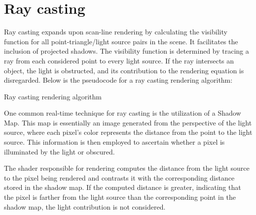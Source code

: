 \section{Ray casting}
Ray casting expands upon scan-line rendering by calculating the visibility function for all point-triangle/light source pairs in the scene. 
It facilitates the inclusion of projected shadows. 
The visibility function is determined by tracing a ray from each considered point to every light source. 
If the ray intersects an object, the light is obstructed, and its contribution to the rendering equation is disregarded. 
Below is the pseudocode for a ray casting rendering algorithm:
\begin{algorithm}[H]
    \caption{Ray casting rendering algorithm}
        \begin{algorithmic}[1]
                                \EndIf{}
                            \EndFor{}
                        \EndIf{}
                    \EndFor{}
                \EndFor{}
            \EndFor{}
        \end{algorithmic}
\end{algorithm}
One common real-time technique for ray casting is the utilization of a Shadow Map. 
This map is essentially an image generated from the perspective of the light source, where each pixel's color represents the distance from the point to the light source.
This information is then employed to ascertain whether a pixel is illuminated by the light or obscured.

The shader responsible for rendering computes the distance from the light source to the pixel being rendered and contrasts it with the corresponding distance stored in the shadow map. 
If the computed distance is greater, indicating that the pixel is farther from the light source than the corresponding point in the shadow map, the light contribution is not considered.